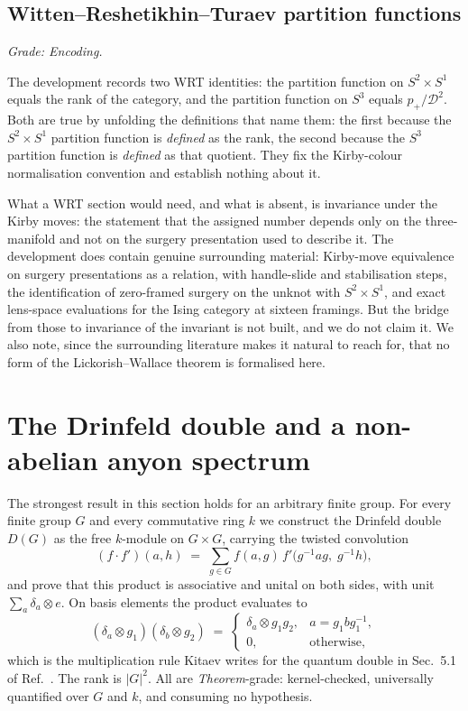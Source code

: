 \documentclass[aps,prx,nofootinbib,superscriptaddress,12pt]{revtex4-2}
\begin{document}
\subsection{Witten--Reshetikhin--Turaev partition functions}

\emph{Grade: Encoding.}

The development records two WRT identities: the partition function on
$S^2 \times S^1$ equals the rank of the category, and the partition
function on $S^3$ equals $p_+/\mathcal{D}^2$. Both are true by unfolding
the definitions that name them: the first because the $S^2 \times S^1$
partition function is \emph{defined} as the rank, the second because the
$S^3$ partition function is \emph{defined} as that quotient. They fix the
Kirby-colour normalisation convention and establish nothing about it.

What a WRT section would need, and what is absent, is invariance under
the Kirby moves: the statement that the assigned number depends only
on the three-manifold and not on the surgery presentation used to
describe it. The development does contain genuine surrounding material:
Kirby-move equivalence on surgery presentations as a relation, with
handle-slide and stabilisation steps, the identification of zero-framed
surgery on the unknot with $S^2 \times S^1$, and exact lens-space
evaluations for the Ising category at sixteen framings. But the bridge
from those to invariance of the invariant is not built, and we do not
claim it. We also note, since the surrounding literature makes it
natural to reach for, that no form of the Lickorish--Wallace theorem is
formalised here.

\section{The Drinfeld double and a non-abelian anyon spectrum}
\label{sec:drinfeld}

The strongest result in this section holds for an arbitrary finite
group. For every finite group $G$ and every commutative ring $k$ we
construct the Drinfeld double $D(G)$ as the free $k$-module on
$G \times G$, carrying the twisted convolution
\[
  (f \cdot f')(a,h) \;=\; \sum_{g \in G} f(a,g)\,
  f'\bigl(g^{-1}ag,\; g^{-1}h\bigr),
\]
and prove that this product is associative and unital on both sides,
with unit $\sum_a \delta_a \otimes e$. On basis elements the product
evaluates to
\begin{equation}
  (\delta_a \otimes g_1)(\delta_b \otimes g_2) \;=\;
  \begin{cases}
    \delta_a \otimes g_1 g_2, & a = g_1 b g_1^{-1},\\
    0, & \text{otherwise,}
  \end{cases}
  \label{eq:ddbasis}
\end{equation}
which is the multiplication rule Kitaev writes for the quantum double in
Sec.~5.1 of Ref.~\cite{KitaevAnyons2003}. The rank is $|G|^2$. All are
\emph{Theorem}-grade: kernel-checked, universally quantified over $G$
and $k$, and consuming no hypothesis.
\end{document}
